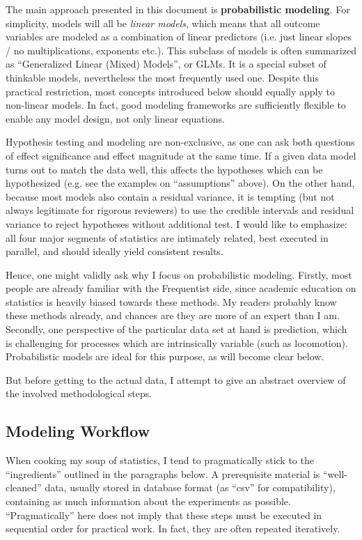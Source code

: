 The main approach presented in this document is \textbf{probabilistic modeling}.
For simplicity, models will all be \emph{linear models}, which means that all outcome variables are modeled as a combination of linear predictors (i.e. just linear slopes / no multiplications, exponents etc.).
This subclass of models is often summarized as ``Generalized Linear (Mixed) Models'', or GLMs.
It is a special subset of thinkable models, nevertheless the most frequently used one.
Despite this practical restriction, most concepts introduced below should equally apply to non-linear models.
In fact, good modeling frameworks are sufficiently flexible to enable any model design, not only linear equations.
\bigskip


Hypothesis testing and modeling are non-exclusive, as one can ask both questions of effect significance and effect magnitude at the same time.
If a given data model turns out to match the data well, this affects the hypotheses which can be hypothesized (e.g. see the examples on ``assumptions'' above).
On the other hand, because most models also contain a residual variance, it is tempting (but not always legitimate for rigorous reviewers) to use the credible intervals and residual variance to reject hypotheses without additional test.
I would like to emphasize: all four major segments of statistics are intimately related, best executed in parallel, and should ideally yield consistent results.

Hence, one might validly ask why I focus on probabilistic modeling.
Firstly, most people are already familiar with the Frequentist side, since academic education on statistics is heavily biased towards these methods.
My readers probably know these methods already, and chances are they are more of an expert than I am.
Secondly, one perspective of the particular data set at hand is prediction, which is challenging for processes which are intrinsically variable (such as locomotion).
Probabilistic models are ideal for this purpose, as will become clear below.

But before getting to the actual data, I attempt to give an abstract overview of the involved methodological steps.

\clearpage
\subsection{Modeling Workflow}
\label{intro:workflow}
When cooking my soup of statistics, I tend to pragmatically stick to the ``ingredients'' outlined in the paragraphs below.
A prerequisite material is ``well-cleaned'' data, usually stored in database format (as ``csv'' for compatibility), containing as much information about the experiments as possible.
``Pragmatically'' here does not imply that these steps must be executed in sequential order for practical work.
In fact, they are often repeated iteratively.


